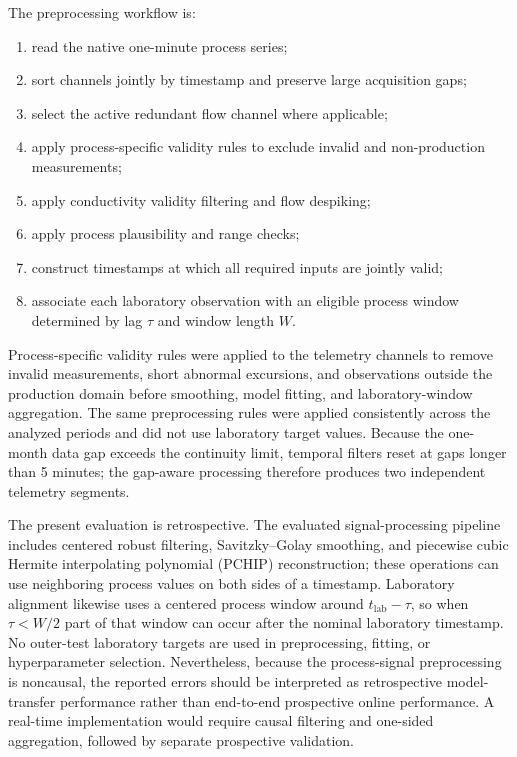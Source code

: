 \documentclass[preprint,12pt,authoryear]{elsarticle}
\begin{document}
The preprocessing workflow is:
\begin{enumerate}[leftmargin=1.8em]
\item read the native one-minute process series;
\item sort channels jointly by timestamp and preserve large acquisition gaps;
\item select the active redundant flow channel where applicable;
\item apply process-specific validity rules to exclude invalid and non-production measurements;
\item apply conductivity validity filtering and flow despiking;
\item apply process plausibility and range checks;
\item construct timestamps at which all required inputs are jointly valid;
\item associate each laboratory observation with an eligible process window determined by lag $\tau$ and window length $W$.
\end{enumerate}

Process-specific validity rules were applied to the telemetry channels to remove invalid measurements, short abnormal excursions, and observations outside the production domain before smoothing, model fitting, and laboratory-window aggregation. The same preprocessing rules were applied consistently across the analyzed periods and did not use laboratory target values. Because the one-month data gap exceeds the continuity limit, temporal filters reset at gaps longer than 5 minutes; the gap-aware processing therefore produces two independent telemetry segments.

The present evaluation is retrospective. The evaluated signal-processing pipeline includes centered robust filtering, Savitzky--Golay smoothing, and piecewise cubic Hermite interpolating polynomial (PCHIP) reconstruction; these operations can use neighboring process values on both sides of a timestamp. Laboratory alignment likewise uses a centered process window around $t_{\mathrm{lab}}-\tau$, so when $\tau<W/2$ part of that window can occur after the nominal laboratory timestamp. No outer-test laboratory targets are used in preprocessing, fitting, or hyperparameter selection. Nevertheless, because the process-signal preprocessing is noncausal, the reported errors should be interpreted as retrospective model-transfer performance rather than end-to-end prospective online performance. A real-time implementation would require causal filtering and one-sided aggregation, followed by separate prospective validation.
\end{document}
